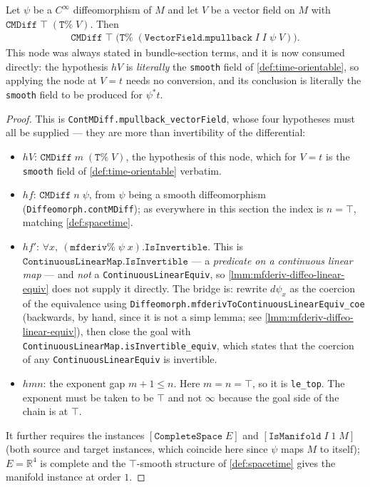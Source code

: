 \begin{lemma}
    \label{lmm:mpullback-vectorField-contMDiff-of-diffeo}
    Let $\psi$ be a $C^\infty$ diffeomorphism of $M$ and let $V$ be a vector field on $M$ with $\mathtt{CMDiff}\;\top\;(\mathtt{T\%}\;V)$. Then
    \begin{align}
        \mathtt{CMDiff}\;\top\;\big(\mathtt{T\%}\;(\mathtt{VectorField.mpullback}\;I\;I\;\psi\;V)\big).
    \end{align}
    This node was always stated in bundle-section terms, and it is now consumed directly: the hypothesis $hV$ is \emph{literally} the \texttt{smooth} field of \ref{def:time-orientable}, so applying the node at $V = t$ needs no conversion, and its conclusion is literally the \texttt{smooth} field to be produced for $\psi^*t$.
\end{lemma}
\begin{proof}
    This is \texttt{ContMDiff.mpullback\_vectorField}, whose four hypotheses must all be supplied --- they are more than invertibility of the differential:
    \begin{itemize}
        \item $hV$: $\mathtt{CMDiff}\;m\;(\mathtt{T\%}\;V)$, the hypothesis of this node, which for $V = t$ is the \texttt{smooth} field of \ref{def:time-orientable} verbatim.
        \item $hf$: $\mathtt{CMDiff}\;n\;\psi$, from $\psi$ being a smooth diffeomorphism (\texttt{Diffeomorph.contMDiff}); as everywhere in this section the index is $n = \top$, matching \ref{def:spacetime}.
        \item $hf'$: $\forall x,\ (\mathtt{mfderiv\%}\;\psi\;x).\mathtt{IsInvertible}$. This is $\mathtt{ContinuousLinearMap.IsInvertible}$ --- a \emph{predicate on a continuous linear map} --- and \emph{not} a \texttt{ContinuousLinearEquiv}, so \ref{lmm:mfderiv-diffeo-linear-equiv} does not supply it directly. The bridge is: rewrite $d\psi_x$ as the coercion of the equivalence using \texttt{Diffeomorph.mfderivToContinuousLinearEquiv\_coe} (backwards, by hand, since it is not a simp lemma; see \ref{lmm:mfderiv-diffeo-linear-equiv}), then close the goal with \texttt{ContinuousLinearMap.isInvertible\_equiv}, which states that the coercion of any \texttt{ContinuousLinearEquiv} is invertible.
        \item $hmn$: the exponent gap $m + 1 \leq n$. Here $m = n = \top$, so it is \texttt{le\_top}. The exponent must be taken to be $\top$ and not $\infty$ because the goal side of the chain is at $\top$.
    \end{itemize}
    It further requires the instances $[\mathtt{CompleteSpace}\;E]$ and $[\mathtt{IsManifold}\;I\;1\;M]$ (both source and target instances, which coincide here since $\psi$ maps $M$ to itself); $E = \mathbb{R}^4$ is complete and the $\top$-smooth structure of \ref{def:spacetime} gives the manifold instance at order $1$.
\end{proof}

